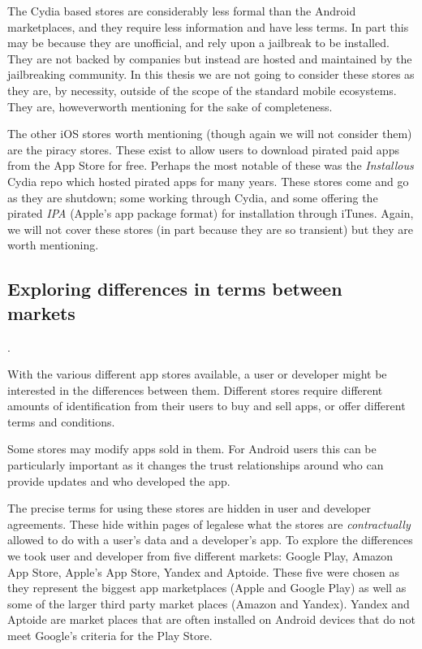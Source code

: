 \documentclass[thesis.tex]{subfiles}
\begin{document}
The Cydia based stores are considerably less formal than the Android marketplaces, and they require less information and have less terms.
In part this may be because they are unofficial, and rely upon a jailbreak to be installed.  They are not backed by companies but instead are hosted and maintained by the jailbreaking community.  In this thesis we are not going to consider these stores as they are, by necessity, outside of the scope of the standard mobile ecosystems.  They are, howeverworth mentioning for the sake of completeness.

The other iOS stores worth mentioning (though again we will not consider them) are the piracy stores.
These exist to allow users to download pirated paid apps from the App Store for free.
Perhaps the most notable of these was the \emph{Installous} Cydia repo which hosted pirated apps for many years.
These stores come and go as they are shutdown; some working through Cydia, and some offering the pirated \emph{IPA} (Apple's app package format) for installation through iTunes.
Again, we will not cover these stores (in part because they are so transient) but they are worth mentioning.

\subsection{Exploring differences in terms between markets}.

With the various different app stores available, a user or developer might be interested in the differences between them.
Different stores require different amounts of identification from their users to buy and sell apps, or offer different terms and conditions.

Some stores may modify apps sold in them.  For Android users this can be particularly important as it changes the trust relationships around who can provide updates and who developed the app.

The precise terms for using these stores are hidden in user and developer agreements.
These hide within pages of legalese what the stores are \emph{contractually} allowed to do with a user's data and a developer's app.
To explore the differences we took user and developer from five different markets: Google Play, Amazon App Store, Apple's App Store, Yandex and Aptoide.
These five were chosen as they represent the biggest app marketplaces (Apple and Google Play) as well as some of the larger third party market places (Amazon and Yandex).
Yandex and Aptoide are market places that are often installed on Android devices that do not meet Google's criteria for the Play Store.
\end{document}

